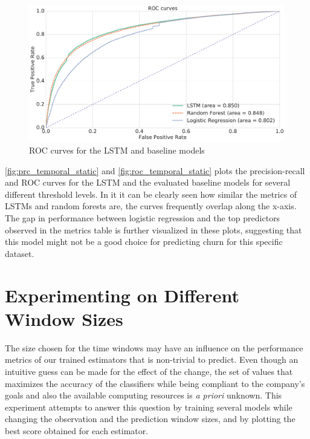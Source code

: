 \documentclass{kththesis}
\begin{document}
\begin{figure}
    \centering
    \includegraphics[width=1.0\textwidth,keepaspectratio]{figures/roc_temporal_static.pdf}
    \caption{ROC curves for the LSTM and baseline models}
    \label{fig:roc_temporal_static}
\end{figure}

\autoref{fig:prc_temporal_static} and \autoref{fig:roc_temporal_static} plots the precision-recall and ROC curves for the LSTM and the evaluated baseline models for several different threshold levels. In it it can be clearly seen how similar the metrics of LSTMs and random forests are, the curves frequently overlap along the x-axis. The gap in performance between logistic regression and the top predictors observed in the metrics table is further visualized in these plots, suggesting that this model might not be a good choice for predicting churn for this specific dataset. 


\section{Experimenting on Different Window Sizes}

The size chosen for the time windows may have an influence on the performance metrics of our trained estimators that is non-trivial to predict. Even though an intuitive guess can be made for the effect of the change, the set of values that maximizes the accuracy of the classifiers while being compliant to the company's goals and also the available computing resources is \textit{a priori} unknown. This experiment attempts to answer this question by training several models while changing the observation and the prediction window sizes, and by plotting the best score obtained for each estimator.

\end{document}

